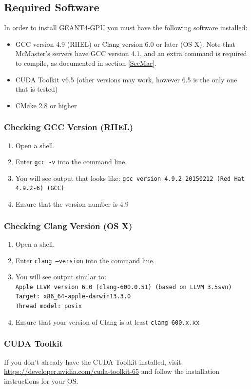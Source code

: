 \documentclass[12pt]{article}
\begin{document}
\subsection{Required Software} %
In order to install GEANT4-GPU you must have the following software installed:
\begin{itemize}
\item GCC version 4.9 (RHEL) or Clang version 6.0 or later (OS X). Note that McMaster's servers have GCC version 4.1, and an extra command is required to compile, as documented in section \ref{SecMac}.
\item CUDA Toolkit v6.5 (other versions may work, however 6.5 is the only one that is tested)
\item CMake 2.8 or higher
\end{itemize}

\subsubsection{Checking GCC Version (RHEL)}
\begin{enumerate}
\item Open a shell.
\item Enter \texttt{gcc -v} into the command line.
\item You will see output that looks like:
\texttt{gcc version 4.9.2 20150212 (Red Hat 4.9.2-6) (GCC)}
\item Ensure that the version number is 4.9
\end{enumerate}

\subsubsection{Checking Clang Version (OS X)}
\begin{enumerate}
\item Open a shell.
\item Enter \texttt{clang --version} into the command line.
\item You will see output similar to: \\
\texttt{Apple LLVM version 6.0 (clang-600.0.51) (based on LLVM 3.5svn)}\\
\texttt{Target: x86\_64-apple-darwin13.3.0}\\
\texttt{Thread model: posix}
\item Ensure that your version of Clang is at least \texttt{clang-600.x.xx}
\end{enumerate}

\subsubsection{CUDA Toolkit}
If you don't already have the CUDA Toolkit installed, visit \url{https://developer.nvidia.com/cuda-toolkit-65} and follow the installation instructions for your OS.\\
\end{document}

